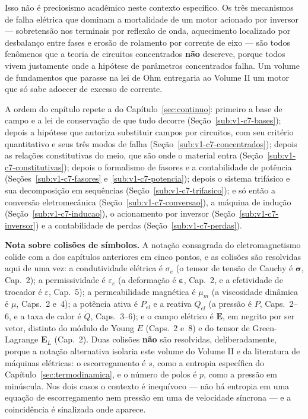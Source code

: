 \documentclass[12pt,a4paper]{article}
\numberwithin{equation}{section}
\numberwithin{table}{section}
\numberwithin{figure}{section}
\begin{document}
Isso não é preciosismo acadêmico neste contexto específico. Os três mecanismos
de falha elétrica que dominam a mortalidade de um motor acionado por inversor
--- sobretensão nos terminais por reflexão de onda, aquecimento localizado por
desbalanço entre fases e erosão de rolamento por corrente de eixo --- são todos
fenômenos que a teoria de circuitos concentrados \textbf{não} descreve, porque
todos vivem justamente onde a hipótese de parâmetros concentrados falha. Um
volume de fundamentos que parasse na lei de Ohm entregaria ao Volume II um
motor que só sabe adoecer de excesso de corrente.

A ordem do capítulo repete a do Capítulo~\ref{sec:continuo}: primeiro a base
de campo e a lei de conservação de que tudo decorre
(Seção~\ref{sub:v1-c7-bases}); depois a hipótese que autoriza substituir campos
por circuitos, com seu critério quantitativo e seus três modos de falha
(Seção~\ref{sub:v1-c7-concentrados}); depois as relações constitutivas do meio,
que são onde o material entra (Seção~\ref{sub:v1-c7-constitutivas}); depois o
formalismo de fasores e a contabilidade de potência
(Seções~\ref{sub:v1-c7-fasores} e~\ref{sub:v1-c7-potencia}); depois o sistema
trifásico e sua decomposição em sequências
(Seção~\ref{sub:v1-c7-trifasico}); e só então a conversão eletromecânica
(Seção~\ref{sub:v1-c7-conversao}), a máquina de indução
(Seção~\ref{sub:v1-c7-inducao}), o acionamento por inversor
(Seção~\ref{sub:v1-c7-inversor}) e a contabilidade de perdas
(Seção~\ref{sub:v1-c7-perdas}).

\textbf{Nota sobre colisões de símbolos.} A notação consagrada do
eletromagnetismo colide com a dos capítulos anteriores em cinco pontos, e as
colisões são resolvidas aqui de uma vez: a condutividade elétrica é
$\sigma_e$ (o tensor de tensão de Cauchy é $\boldsymbol{\sigma}$, Cap.~2); a
permissividade é $\varepsilon_e$ (a deformação é $\boldsymbol{\varepsilon}$,
Cap.~2, e a efetividade de trocador é $\varepsilon$, Cap.~5); a permeabilidade
magnética é $\mu_m$ (a viscosidade dinâmica é $\mu$, Caps.~2 e~4); a potência
ativa é $P_{el}$ e a reativa $Q_{el}$ (a pressão é $P$, Caps.~2--6, e a taxa de
calor é $\dot{Q}$, Caps.~3--6); e o campo elétrico é $\mathbf{E}$, em negrito
por ser vetor, distinto do módulo de Young $E$ (Caps.~2 e~8) e do tensor de
Green-Lagrange $\mathbf{E}_L$ (Cap.~2). Duas colisões \textbf{não} são
resolvidas, deliberadamente, porque a notação alternativa isolaria este volume
do Volume II e da literatura de máquinas elétricas: o escorregamento é $s$,
como a entropia específica do Capítulo~\ref{sec:termodinamica}, e o número de
polos é $p$, como a pressão em minúscula. Nos dois casos o contexto é
inequívoco --- não há entropia em uma equação de escorregamento nem pressão em
uma de velocidade síncrona --- e a coincidência é sinalizada onde aparece.
\end{document}
